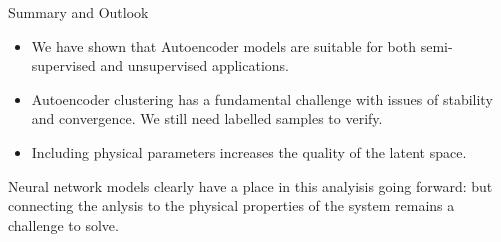 \documentclass{beamer}
\begin{document}
\begin{frame}[t]{Summary and Outlook}
	\begin{itemize}
		\item We have shown that Autoencoder models are suitable for both semi-supervised and unsupervised applications.
		\item Autoencoder clustering has a fundamental challenge with issues of stability and convergence. We still need labelled samples to verify.
		\item Including physical parameters increases the quality of the latent space.
	\end{itemize}
	Neural network models clearly have a place in this analyisis going forward: but connecting the anlysis to the physical properties of the system remains a challenge to solve.
\end{frame}
\end{document}
